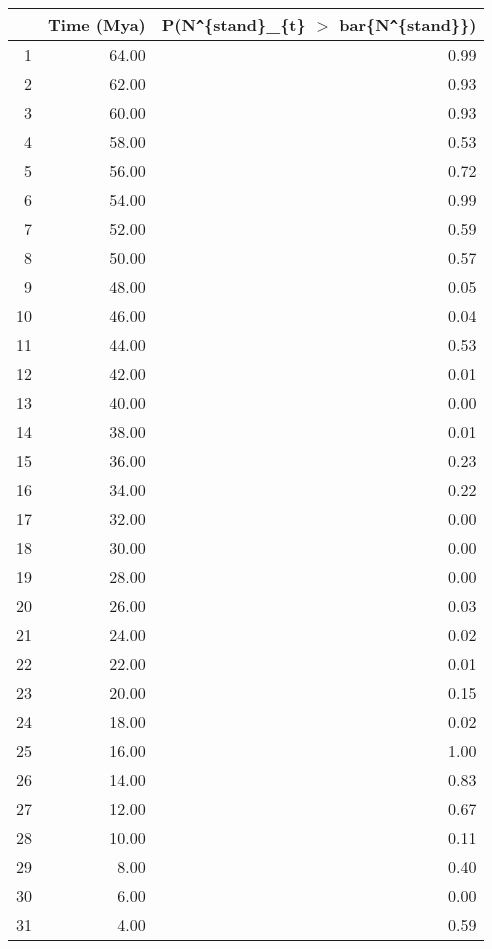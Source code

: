 \begin{table}[ht]
\centering
\begin{tabular}{rrr}
  \hline
 & Time (Mya) & P(N\verb|^|\{stand\}\_\{t\} $>$ bar\{N\verb|^|\{stand\}\}) \\ 
  \hline
1 & 64.00 & 0.99 \\ 
  2 & 62.00 & 0.93 \\ 
  3 & 60.00 & 0.93 \\ 
  4 & 58.00 & 0.53 \\ 
  5 & 56.00 & 0.72 \\ 
  6 & 54.00 & 0.99 \\ 
  7 & 52.00 & 0.59 \\ 
  8 & 50.00 & 0.57 \\ 
  9 & 48.00 & 0.05 \\ 
  10 & 46.00 & 0.04 \\ 
  11 & 44.00 & 0.53 \\ 
  12 & 42.00 & 0.01 \\ 
  13 & 40.00 & 0.00 \\ 
  14 & 38.00 & 0.01 \\ 
  15 & 36.00 & 0.23 \\ 
  16 & 34.00 & 0.22 \\ 
  17 & 32.00 & 0.00 \\ 
  18 & 30.00 & 0.00 \\ 
  19 & 28.00 & 0.00 \\ 
  20 & 26.00 & 0.03 \\ 
  21 & 24.00 & 0.02 \\ 
  22 & 22.00 & 0.01 \\ 
  23 & 20.00 & 0.15 \\ 
  24 & 18.00 & 0.02 \\ 
  25 & 16.00 & 1.00 \\ 
  26 & 14.00 & 0.83 \\ 
  27 & 12.00 & 0.67 \\ 
  28 & 10.00 & 0.11 \\ 
  29 & 8.00 & 0.40 \\ 
  30 & 6.00 & 0.00 \\ 
  31 & 4.00 & 0.59 \\ 
   \hline
\end{tabular}
\label{tab:div_peak}
\end{table}
